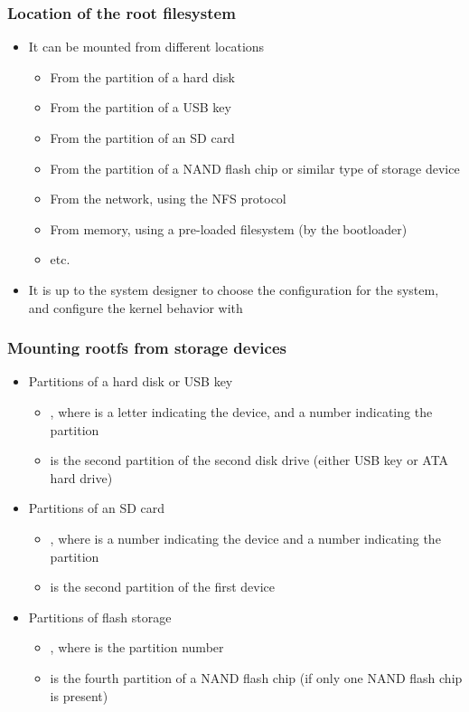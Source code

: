 \begin{frame}
  \frametitle{Location of the root filesystem}
  \begin{itemize}
  \item It can be mounted from different locations
    \begin{itemize}
    \item From the partition of a hard disk
    \item From the partition of a USB key
    \item From the partition of an SD card
    \item From the partition of a NAND flash chip or similar type of
      storage device
    \item From the network, using the NFS protocol
    \item From memory, using a pre-loaded filesystem (by the
      bootloader)
    \item etc.
    \end{itemize}
  \item It is up to the system designer to choose the configuration
    for the system, and configure the kernel behavior with
  \end{itemize}
\end{frame}

\begin{frame}
  \frametitle{Mounting rootfs from storage devices}
  \begin{itemize}
  \item Partitions of a hard disk or USB key
    \begin{itemize}
    \item {}, where  is a letter indicating
      the device, and  a number indicating the partition
    \item {} is the second partition of the second disk
      drive (either USB key or ATA hard drive)
    \end{itemize}
  \item Partitions of an SD card
    \begin{itemize}
    \item {}, where  is a number
      indicating the device and  a number indicating the
      partition
    \item {} is the second partition of the first
      device
    \end{itemize}
  \item Partitions of flash storage
    \begin{itemize}
    \item {}, where  is the partition number
    \item {} is the fourth partition of a NAND
      flash chip (if only one NAND flash chip is present)
    \end{itemize}
  \end{itemize}
\end{frame}

